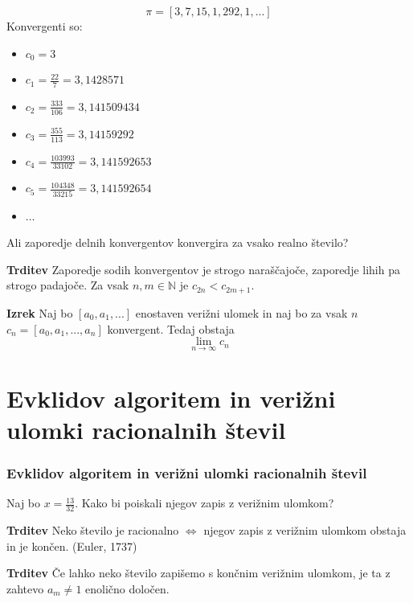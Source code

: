 \documentclass{beamer}
\newcommand{\N}{\mathbb{N}}
\newenvironment{iz}{\begin{block}{\textbf{Izrek}}}{\end{block}}
\newenvironment{trd}{\begin{block}{\textbf{Trditev}}}{\end{block}}
\begin{document}
\begin{frame}
\[ \pi = [3, 7, 15, 1, 292, 1, ...] \] \pause
Konvergenti so:
	\begin{itemize}
	\item $c_0 = 3$
	\item $c_1 = \frac{22}{7} = 3,1428571$
	\item $c_2 = \frac{333}{106} = 3,141509434$
	\item $c_3 = \frac{355}{113} = 3,14159292$
	\item $c_4 = \frac{103993}{33102} = 3,141592653$
	\item $c_5 = \frac{104348}{33215} = 3,141592654$
	\item ...
	\end{itemize}
	\vspace{5mm}
\pause
Ali zaporedje delnih konvergentov konvergira za vsako realno število?
\end{frame}

\begin{frame}
	\begin{trd}
	Zaporedje sodih konvergentov je strogo naraščajoče, zaporedje lihih pa strogo padajoče. Za vsak $n, m \in \N$ je  $c_{2n} < c_{2m+1}.$
	\end{trd}    \pause
	\begin{iz}
	Naj bo $[a_0, a_1, ...]$ enostaven verižni ulomek in naj bo za vsak $n$ $c_n = [a_0, a_1, ..., a_n]$ konvergent. Tedaj obstaja $$\lim_{n\to\infty}c_n$$
	\end{iz}
\end{frame}

\section{Evklidov algoritem in verižni ulomki racionalnih števil}

\begin{frame}
\frametitle{Evklidov algoritem in verižni ulomki racionalnih števil}
Naj bo $x = \frac{13}{32}$. Kako bi poiskali njegov zapis z verižnim ulomkom?
\pause
	\begin{trd}
	Neko število je racionalno $\Leftrightarrow$ njegov zapis z verižnim ulomkom obstaja in je končen. (Euler, 1737)
	\end{trd} \pause
	\begin{trd}
	Če lahko neko število zapišemo s končnim verižnim ulomkom, je ta z zahtevo $a_m \neq 1$ enolično določen.
	\end{trd}
\end{frame}
\end{document}
